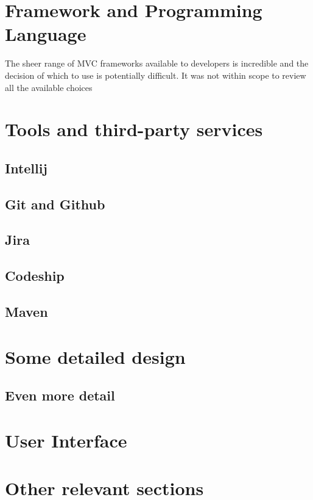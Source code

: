 \section{Framework and Programming Language}

The sheer range of MVC frameworks available to developers is incredible and the decision of which to use is potentially difficult. It was not within scope to review all the available choices 


\section{Tools and third-party services}
\subsection{Intellij}
\subsection{Git and Github}
\subsection{Jira}
\subsection{Codeship}
\subsection{Maven}

\section{Some detailed design}

\subsection{Even more detail}

\section{User Interface}

\section{Other relevant sections}